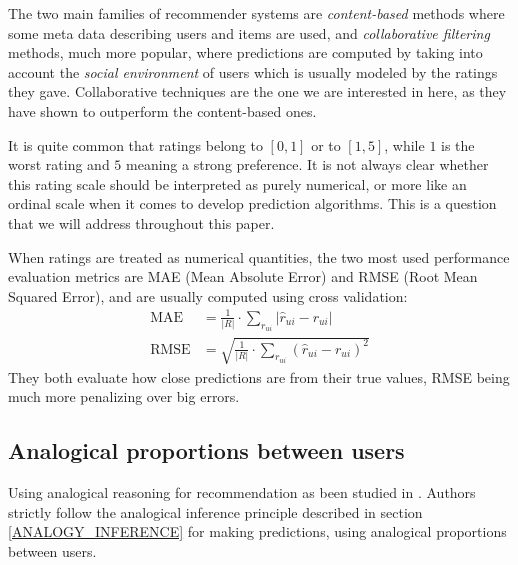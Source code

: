 \documentclass[conference]{IEEEtran}
\newcommand{\predr}[1]{\hat{r}_{#1}}
\begin{document}
The two main families of recommender systems are \textit{content-based} methods
where some meta data describing users and items are used, and
\textit{collaborative filtering} methods, much more popular, where predictions
are computed by taking into account the \textit{social environment} of users
which is usually modeled by the ratings they gave. Collaborative techniques are
the one we are interested in here, as they have shown to outperform the
content-based ones.

It is quite common that ratings belong to $[0, 1]$ or to $[1, 5]$, while $1$ is
the worst rating and $5$ meaning a strong preference. It is not always clear
whether this rating scale should be interpreted as purely numerical, or more
like an ordinal scale when it comes to develop prediction algorithms. This is
a question that we will address throughout this paper.

 When ratings are treated as numerical quantities, the two most used
 performance evaluation metrics are MAE (Mean Absolute Error) and RMSE (Root
 Mean Squared Error), and are usually computed using cross validation:
\begin{align}
\text{MAE} &= \frac{1}{|R|} \cdot \sum_{r_{ui}} |\predr{ui} - r_{ui}|\\
\text{RMSE} &= \sqrt{\frac{1}{|R|} \cdot \sum_{r_{ui}} (\predr{ui} - r_{ui})^2}
\end{align}
They both evaluate how close predictions are from their true values, RMSE being
much more penalizing over big errors.

\subsection{Analogical proportions between users}
\label{ANALOGY_USERS}
Using analogical reasoning for recommendation as been studied in
\cite{HugPR15}. Authors strictly follow the analogical inference
principle described in section \ref{ANALOGY_INFERENCE} for making predictions,
using analogical proportions between users.
\end{document}
